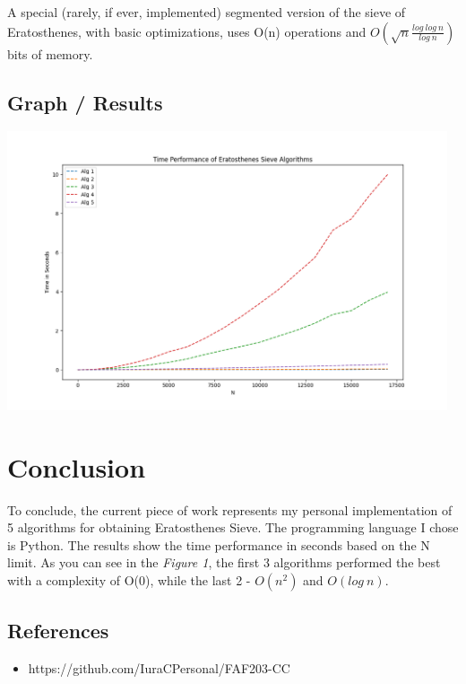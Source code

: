 \documentclass[a4paper, 12pt]{article}
\begin{document}
A special (rarely, if ever, implemented) segmented version of the sieve of Eratosthenes, 
with basic optimizations, uses O(n) operations and $O(\sqrt{n}\frac{log\ log\ n}{log \ n})$ bits of memory.

\subsection{Graph / Results}

\begin{center}
  \includegraphics[width=13cm]{graph.png}
\end{center}

\newpage

\section{Conclusion}

To conclude, the current piece of work represents my personal implementation of 
5 algorithms for obtaining Eratosthenes Sieve. The programming language I chose is 
Python. The results show the time performance in seconds based on the N limit. 
As you can see in the \textit{Figure 1}, the first 3 algorithms performed the best with 
a complexity of O(0), while the last 2 - $O(n^2)$ and $O(log \ n)$.  

\subsection*{References}

\begin{itemize}
  \item https://github.com/IuraCPersonal/FAF203-CC
\end{itemize}
\end{document}
